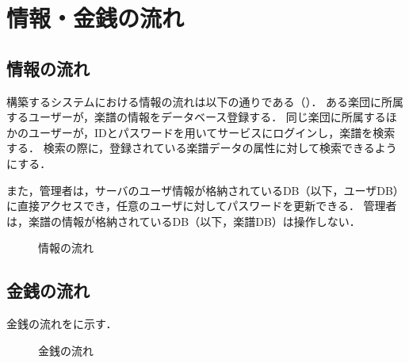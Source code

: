 \chapter{情報・金銭の流れ}
\section{情報の流れ}\label{sec:情報の流れ}
構築するシステムにおける情報の流れは以下の通りである（）．
ある楽団に所属するユーザーが，楽譜の情報をデータベース登録する．
同じ楽団に所属するほかのユーザーが，IDとパスワードを用いてサービスにログインし，楽譜を検索する．
検索の際に，登録されている楽譜データの属性に対して検索できるようにする．\par
また，管理者は，サーバのユーザ情報が格納されているDB（以下，ユーザDB）に直接アクセスでき，任意のユーザに対してパスワードを更新できる．
管理者は，楽譜の情報が格納されているDB（以下，楽譜DB）は操作しない．
\begin{figure}[h]
    \centering
    
    \caption{情報の流れ}
    \label{fig:情報の流れ}
\end{figure}
\section{金銭の流れ}\label{sec:金銭の流れ}
金銭の流れをに示す．
\begin{figure}[h]
    \centering
    
    \caption{金銭の流れ}
    \label{fig:金銭の流れ}
\end{figure}

